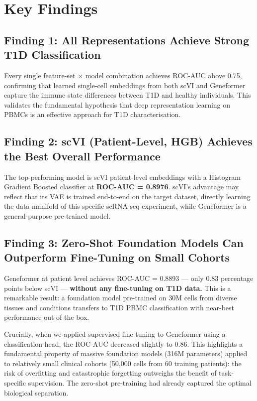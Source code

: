 \section{Key Findings}

\subsection{Finding 1: All Representations Achieve Strong T1D Classification}

Every single feature-set $\times$ model combination achieves ROC-AUC above 0.75, confirming that learned single-cell embeddings from both scVI and Geneformer capture the immune state differences between T1D and healthy individuals. This validates the fundamental hypothesis that deep representation learning on PBMCs is an effective approach for T1D characterisation.

\subsection{Finding 2: scVI (Patient-Level, HGB) Achieves the Best Overall Performance}

The top-performing model is scVI patient-level embeddings with a Histogram Gradient Boosted classifier at \textbf{ROC-AUC = 0.8976}. scVI's advantage may reflect that its VAE is trained end-to-end on the target dataset, directly learning the data manifold of this specific scRNA-seq experiment, while Geneformer is a general-purpose pre-trained model.

\subsection{Finding 3: Zero-Shot Foundation Models Can Outperform Fine-Tuning on Small Cohorts}

Geneformer at patient level achieves ROC-AUC = 0.8893 --- only 0.83 percentage points below scVI --- \textbf{without any fine-tuning on T1D data.} This is a remarkable result: a foundation model pre-trained on 30M cells from diverse tissues and conditions transfers to T1D PBMC classification with near-best performance out of the box. 

Crucially, when we applied supervised fine-tuning to Geneformer using a classification head, the ROC-AUC decreased slightly to 0.86. This highlights a fundamental property of massive foundation models (316M parameters) applied to relatively small clinical cohorts (50,000 cells from 60 training patients): the risk of overfitting and catastrophic forgetting outweighs the benefit of task-specific supervision. The zero-shot pre-training had already captured the optimal biological separation.

